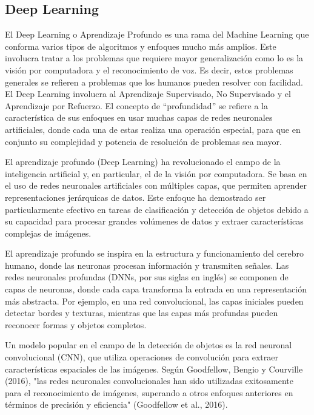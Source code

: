 \subsection{Deep Learning}

El Deep Learning o Aprendizaje Profundo es una rama del Machine Learning que conforma varios tipos de algoritmos y enfoques mucho más amplios. Este involucra tratar a los problemas que requiere mayor generalización como lo es la visión por computadora y el reconocimiento de voz. Es decir, estos problemas generales se refieren a problemas que los humanos pueden resolver con facilidad. El Deep Learning involucra al Aprendizaje Supervisado, No Supervisado y el Aprendizaje por Refuerzo. El concepto de “profundidad” se refiere a la característica de sus enfoques en usar muchas capas de redes neuronales artificiales, donde cada una de estas realiza una operación especial, para que en conjunto su complejidad y potencia de resolución de problemas sea mayor. \parencite{bk_hurbans2020grokking}


El aprendizaje profundo (Deep Learning) ha revolucionado el campo de la inteligencia artificial y, en particular, el de la visión por computadora. Se basa en el uso de redes neuronales artificiales con múltiples capas, que permiten aprender representaciones jerárquicas de datos. Este enfoque ha demostrado ser particularmente efectivo en tareas de clasificación y detección de objetos debido a su capacidad para procesar grandes volúmenes de datos y extraer características complejas de imágenes.


El aprendizaje profundo se inspira en la estructura y funcionamiento del cerebro humano, donde las neuronas procesan información y transmiten señales. Las redes neuronales profundas (DNNs, por sus siglas en inglés) se componen de capas de neuronas, donde cada capa transforma la entrada en una representación más abstracta. Por ejemplo, en una red convolucional, las capas iniciales pueden detectar bordes y texturas, mientras que las capas más profundas pueden reconocer formas y objetos completos.

Un modelo popular en el campo de la detección de objetos es la red neuronal convolucional (CNN), que utiliza operaciones de convolución para extraer características espaciales de las imágenes. Según Goodfellow, Bengio y Courville (2016), "las redes neuronales convolucionales han sido utilizadas exitosamente para el reconocimiento de imágenes, superando a otros enfoques anteriores en términos de precisión y eficiencia" (Goodfellow et al., 2016).

